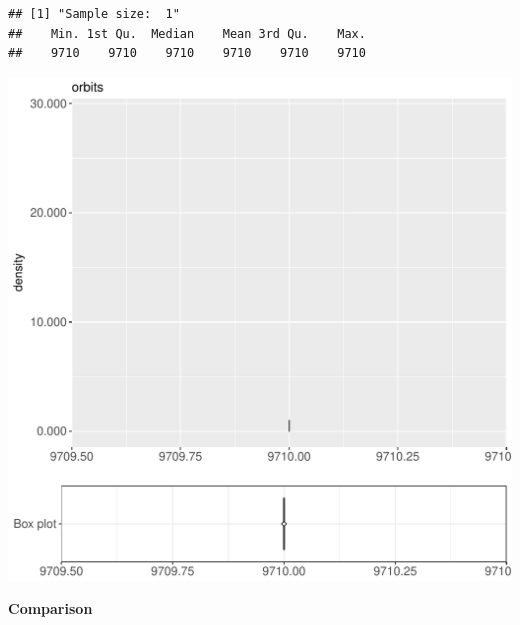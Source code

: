 \documentclass{article}\usepackage[]{graphicx}\usepackage[]{color}
\makeatletter
\def\maxwidth{ %
  \ifdim\Gin@nat@width>\linewidth
    \linewidth
  \else
    \Gin@nat@width
  \fi
}
\newenvironment{kframe}{%
 \def\at@end@of@kframe{}%
 \ifinner\ifhmode%
  \def\at@end@of@kframe{\end{minipage}}%
  \begin{minipage}{\columnwidth}%
 \fi\fi%
 \def\FrameCommand##1{\hskip\@totalleftmargin \hskip-\fboxsep
 \colorbox{shadecolor}{##1}\hskip-\fboxsep
     \hskip-\linewidth \hskip-\@totalleftmargin \hskip\columnwidth}%
 \MakeFramed {\advance\hsize-\width
   \@totalleftmargin\z@ \linewidth\hsize
   \@setminipage}}%
 {\par\unskip\endMakeFramed%
 \at@end@of@kframe}
\newenvironment{knitrout}{}{} %
\makeatother
\begin{document}
\begin{knitrout}
\color{fgcolor}\begin{kframe}
\begin{verbatim}
## [1] "Sample size:  1"
##    Min. 1st Qu.  Median    Mean 3rd Qu.    Max. 
##    9710    9710    9710    9710    9710    9710
\end{verbatim}


{\ttfamily\noindent\bfseries{}}\end{kframe}
\includegraphics[width=\maxwidth]{figure/RH4_noCache_small-1} 

\end{knitrout}
  
 \textbf{Comparison}
  
\end{document}
